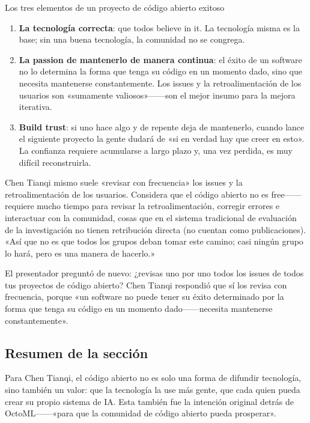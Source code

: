 \documentclass[a4paper]{article}
\begin{document}
\begin{importantbox}{Los tres elementos de un proyecto de código abierto exitoso}
\begin{enumerate}
    \item \textbf{La tecnología correcta}: que todos believe in it. La tecnología misma es la base; sin una buena tecnología, la comunidad no se congrega.
    \item \textbf{La passion de mantenerlo de manera continua}: el éxito de un software no lo determina la forma que tenga su código en un momento dado, sino que necesita mantenerse constantemente. Los issues y la retroalimentación de los usuarios son «sumamente valiosos»------son el mejor insumo para la mejora iterativa.
    \item \textbf{Build trust}: si uno hace algo y de repente deja de mantenerlo, cuando lance el siguiente proyecto la gente dudará de «si en verdad hay que creer en esto». La confianza requiere acumularse a largo plazo y, una vez perdida, es muy difícil reconstruirla.
\end{enumerate}
\end{importantbox}

Chen Tianqi mismo suele «revisar con frecuencia» los issues y la retroalimentación de los usuarios. Considera que el código abierto no es free------requiere mucho tiempo para revisar la retroalimentación, corregir errores e interactuar con la comunidad, cosas que en el sistema tradicional de evaluación de la investigación no tienen retribución directa (no cuentan como publicaciones). «Así que no es que todos los grupos deban tomar este camino; casi ningún grupo lo hará, pero es una manera de hacerlo.»

El presentador preguntó de nuevo: ¿revisas uno por uno todos los issues de todos tus proyectos de código abierto? Chen Tianqi respondió que sí los revisa con frecuencia, porque «un software no puede tener su éxito determinado por la forma que tenga su código en un momento dado------necesita mantenerse constantemente».

\subsection{Resumen de la sección}

Para Chen Tianqi, el código abierto no es solo una forma de difundir tecnología, sino también un valor: que la tecnología la use más gente, que cada quien pueda crear su propio sistema de IA. Esta también fue la intención original detrás de OctoML------«para que la comunidad de código abierto pueda prosperar».
\end{document}
